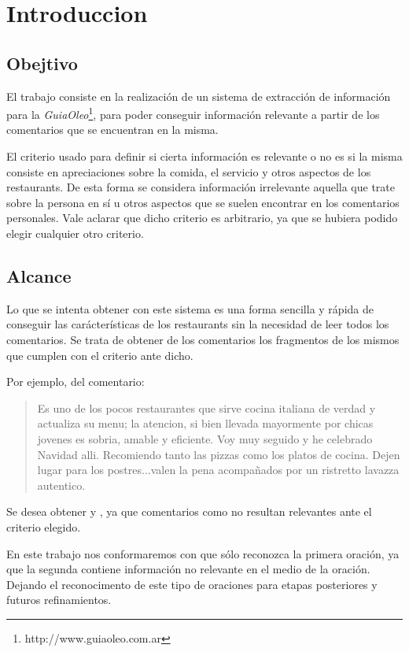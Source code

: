 \section{Introduccion}

\subsection{Obejtivo}

El trabajo consiste en la realización de un sistema de extracción de información para la \emph{GuiaOleo}\footnote{http://www.guiaoleo.com.ar}, para poder conseguir información relevante a partir de los comentarios que se encuentran en la misma.

El criterio usado para definir si cierta información es relevante o no es si la misma consiste en apreciaciones sobre la comida, el servicio y otros aspectos de los restaurants. De esta forma se considera información irrelevante aquella que trate sobre la persona en sí u otros aspectos  que se suelen encontrar en los comentarios personales.
Vale aclarar que dicho criterio es arbitrario, ya que se hubiera podido elegir cualquier otro criterio.

\subsection{Alcance}

Lo que se intenta obtener con este sistema es una forma sencilla y rápida de conseguir las carácterísticas de los restaurants sin la necesidad de leer todos los comentarios. Se trata de obtener de los comentarios los fragmentos de los mismos que cumplen con el criterio ante dicho.

Por ejemplo, del comentario:

\begin{quotation}
Es uno de los pocos restaurantes que sirve cocina italiana de verdad y actualiza su menu; la atencion, si bien llevada mayormente por chicas jovenes es sobria, amable y eficiente. Voy muy seguido y he celebrado Navidad alli. Recomiendo tanto las pizzas como los platos de cocina. Dejen lugar para los postres...valen la pena acompañados por un ristretto lavazza autentico.
\end{quotation}

Se desea obtener  y , ya que comentarios como  no resultan relevantes ante el criterio elegido.

En este trabajo nos conformaremos con que sólo reconozca la primera oración, ya que la segunda contiene información no relevante en el medio de la oración. Dejando el reconocimento de este tipo de oraciones para etapas posteriores y futuros refinamientos.